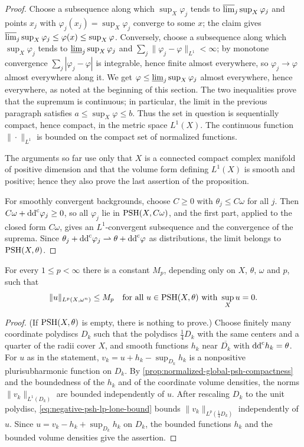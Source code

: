 \begin{proof}
Choose a subsequence along which $\sup_X\varphi_j$ tends to $\varlimsup_j\sup_X\varphi_j$ and points $x_j$ with $\varphi_j(x_j)=\sup_X\varphi_j$ converge to some $x$; the claim gives $\varlimsup_j\sup_X\varphi_j\leq\varphi(x)\leq\sup_X\varphi$. Conversely, choose a subsequence along which $\sup_X\varphi_j$ tends to $\varliminf_j\sup_X\varphi_j$ and $\sum_j\|\varphi_j-\varphi\|_{L^1}<\infty$; by monotone convergence $\sum_j|\varphi_j-\varphi|$ is integrable, hence finite almost everywhere, so $\varphi_j\to\varphi$ almost everywhere along it. We get $\varphi\leq\varliminf_j\sup_X\varphi_j$ almost everywhere, hence everywhere, as noted at the beginning of this section. The two inequalities prove that the supremum is continuous; in particular, the limit in the previous paragraph satisfies $a\leq\sup_X\varphi\leq b$. Thus the set in question is sequentially compact, hence compact, in the metric space $L^1(X)$. The continuous function $\|\cdot\|_{L^1}$ is bounded on the compact set of normalized functions.

The arguments so far use only that $X$ is a connected compact complex manifold of positive dimension and that the volume form defining $L^1(X)$ is smooth and positive; hence they also prove the last assertion of the proposition.

For smoothly convergent backgrounds, choose $C\geq0$ with $\theta_j\leq C\omega$ for all $j$. Then $C\omega+\mathrm{dd}^{\mathrm{c}}\varphi_j\geq0$, so all $\varphi_j$ lie in $\mathrm{PSH}(X,C\omega)$, and the first part, applied to the closed form $C\omega$, gives an $L^1$-convergent subsequence and the convergence of the suprema. Since $\theta_j+\mathrm{dd}^{\mathrm{c}}\varphi_j\rightharpoonup\theta+\mathrm{dd}^{\mathrm{c}}\varphi$ as distributions, the limit belongs to $\mathrm{PSH}(X,\theta)$.
\end{proof}

\begin{corollary}\label{cor:normalized-global-psh-lp-bound}
For every $1\leq p<\infty$ there is a constant $M_p$, depending only on $X$, $\theta$, $\omega$ and $p$, such that
\[
 \|u\|_{L^p(X,\omega^n)}\leq M_p
           \quad\text{for all }u\in\mathrm{PSH}(X,\theta)\text{ with }\sup_Xu=0.
\]
\end{corollary}
\begin{proof}
(If $\mathrm{PSH}(X,\theta)$ is empty, there is nothing to prove.) Choose finitely many coordinate polydiscs $D_k$ such that the polydiscs $\frac14D_k$ with the same centers and a quarter of the radii cover $X$, and smooth functions $h_k$ near $\overline{D_k}$ with $\mathrm{dd}^{\mathrm{c}} h_k=\theta$. For $u$ as in the statement, $v_k=u+h_k-\sup_{D_k}h_k$ is a nonpositive plurisubharmonic function on $D_k$. By \cref{prop:normalized-global-psh-compactness} and the boundedness of the $h_k$ and of the coordinate volume densities, the norms $\|v_k\|_{L^1(D_k)}$ are bounded independently of $u$. After rescaling $D_k$ to the unit polydisc, \eqref{eq:negative-psh-lp-lone-bound} bounds $\|v_k\|_{L^p(\frac14D_k)}$ independently of $u$. Since $u=v_k-h_k+\sup_{D_k}h_k$ on $D_k$, the bounded functions $h_k$ and the bounded volume densities give the assertion.
\end{proof}

